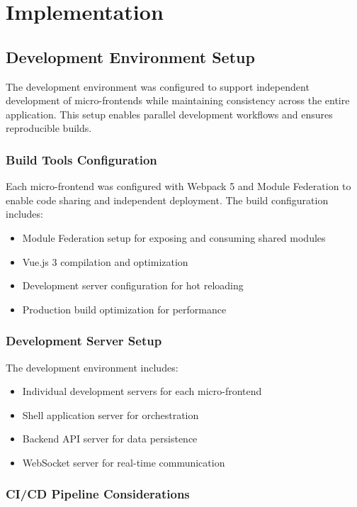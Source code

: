 \documentclass[12pt,a4paper]{report}
\begin{document}
\chapter{Implementation}
\section{Development Environment Setup}

The development environment was configured to support independent development of micro-frontends while maintaining consistency across the entire application. This setup enables parallel development workflows and ensures reproducible builds.

\subsection{Build Tools Configuration}

Each micro-frontend was configured with Webpack 5 and Module Federation to enable code sharing and independent deployment. The build configuration includes:
\begin{itemize}
    \item Module Federation setup for exposing and consuming shared modules
    \item Vue.js 3 compilation and optimization
    \item Development server configuration for hot reloading
    \item Production build optimization for performance
\end{itemize}

\subsection{Development Server Setup}

The development environment includes:
\begin{itemize}
    \item Individual development servers for each micro-frontend
    \item Shell application server for orchestration
    \item Backend API server for data persistence
    \item WebSocket server for real-time communication
\end{itemize}

\subsection{CI/CD Pipeline Considerations}
\end{document}
